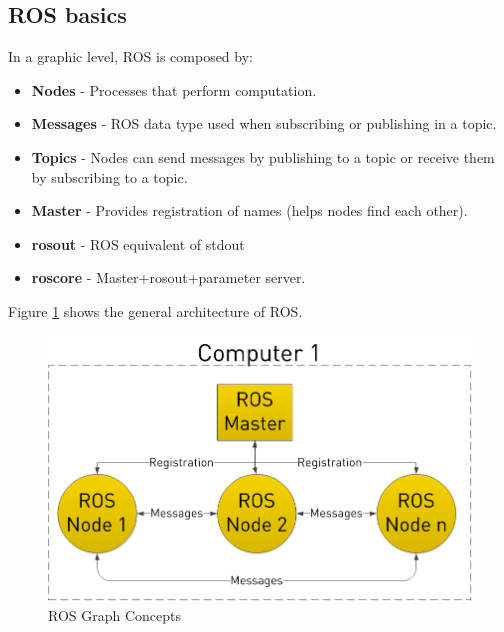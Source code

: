 \documentclass[12pt]{article}
\begin{document}
\subsection{ROS basics}
In a graphic level, ROS is composed by:
\begin{itemize}
\item \textbf{Nodes} - Processes that perform computation.
\item \textbf{Messages} - ROS data type used when subscribing or publishing in a topic. 
\item \textbf{Topics} - Nodes can send messages by publishing to a topic or receive them by subscribing to a topic. 
\item \textbf{Master} - Provides registration of names (helps nodes find each other).
\item \textbf{rosout} - ROS equivalent of stdout 
\item \textbf{roscore} - Master+rosout+parameter server. 
\end{itemize}
Figure \ref{fig:ros_concepts} shows the general architecture of ROS.

\begin{figure}[!htb]
    \centering
    \includegraphics[scale=0.25]{ros_graph.png}
    \caption{ROS Graph Concepts}
    \label{fig:ros_concepts}
\end{figure}
\end{document}
